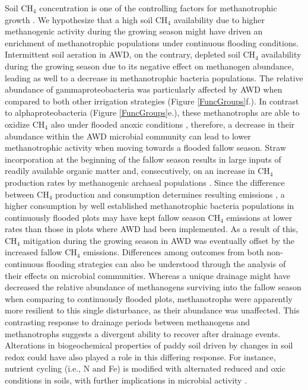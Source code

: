 Soil CH$_{4}$ concentration is one of the controlling factors for methanotrophic growth \citep{jiao2006}. We hypothesize that a high soil CH$_{4}$ availability due to higher methanogenic activity during the growing season might have driven an enrichment of methanotrophic populations under continuous flooding conditions. Intermittent soil aeration in AWD, on the contrary, depleted soil CH$_{4}$ availability during the growing season due to its negative effect on methanogen abundance, leading as well to a decrease in methanotrophic bacteria populations. The relative abundance of gammaproteobacteria was particularly affected by AWD when compared to both other irrigation strategies (Figure \ref{FuncGroups}f.). In contrast to alphaproteobacteria (Figure \ref{FuncGroups}e.), these methanotrophs are able to oxidize CH$_{4}$ also under flooded anoxic conditions \citep{schorn2024}, therefore, a decrease in their abundance within the AWD microbial community can lead to lower methanotrophic activity when moving towards a flooded fallow season. Straw incorporation at the beginning of the fallow season results in large inputs of readily available organic matter and, consecutively, on an increase in CH$_{4}$ production rates by methanogenic archaeal populations \citep{wassmann1993methane}. Since the difference between CH$_{4}$ production and consumption determines resulting emissions \citep{conrad2009global}, a higher consumption by well established methanotrophic bacteria populations in continuously flooded plots may have kept fallow season CH$_{4}$ emissions at lower rates than those in plots where AWD had been implemented. As a result of this, CH$_{4}$ mitigation during the growing season in AWD was eventually offset by the increased fallow CH$_{4}$ emissions. Differences among outcomes from both non-continuous flooding strategies can also be understood through the analysis of their effects on microbial communities. Whereas a unique drainage might have decreased the relative abundance of methanogens surviving into the fallow season when comparing to continuously flooded plots, methanotrophs were apparently more resilient to this single disturbance, as their abundance was unaffected. This contrasting response to drainage periods between methanogens and methanotrophs suggests a divergent ability to recover after drainage events. Alterations in biogeochemical properties of paddy soil driven by changes in soil redox could have also played a role in this differing response. For instance, nutrient cycling (i.e., N and Fe) is modified with alternated reduced and oxic conditions in soils, with further implications in microbial activity \citep{chen2023}. \\


